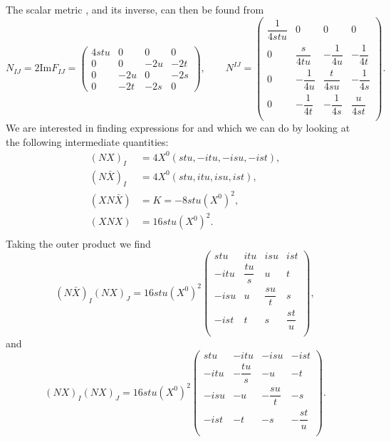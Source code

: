 The scalar metric , and its inverse, can then be found from
\begin{equation}
        N_{IJ} = 2\text{Im}F_{IJ} =  \begin{pmatrix} 4stu & 0 & 0 & 0  \\[4pt]
    0 & 0 &-2u & -2t \\[4pt]
   0 & -2u & 0 & -2s \\[4pt]
   0 & -2t & -2s & 0
    \end{pmatrix}, 
    \qquad 
    N^{IJ} =    \left(
\begin{array}{cccc}
 \dfrac{1}{4 s t u} & 0 & 0 & 0 \\[9pt]
 0 & \dfrac{s}{4 t u} & -\dfrac{1}{4 u} & -\dfrac{1}{4 t} \\[9pt]
 0 & -\dfrac{1}{4 u} & \dfrac{t}{4 s u} & -\dfrac{1}{4 s} \\[9pt]
 0 & -\dfrac{1}{4 t} & -\dfrac{1}{4 s} & \dfrac{u}{4 s t} \\[9pt]
\end{array}
\right).
\end{equation}
We are interested in finding expressions for  and  which we can do by looking at the following intermediate quantities:
\begin{equation*}
\begin{aligned}
    (NX)_I &= 4X^0 \left(  s t u ,- i t u ,- i s u,- i s t  \right), \\
    (N\bar{X})_I &= 4X^0\left(  s t u , i t u , i s u , i s t  \right),\\
    (XN\bar{X}) &= K = -8stu (X^0)^2,\\
    (XNX) &= 16 s t u (X^0)^2 .  \\
\end{aligned}
\end{equation*}
Taking the outer product we find
\begin{equation*}
    (N\bar{X})_I(NX)_J = 16stu (X^0)^2 \left(
\begin{array}{cccc}
 s t u & i t u & i s u & i s t \\[5pt]
 -i t u & \dfrac{t u}{s} & u & t \\[5pt]
 -i s u & u & \dfrac{s u}{t} & s \\[5pt]
 -i s t & t & s & \dfrac{s t}{u} \\
\end{array}
\right),
\end{equation*}
and
\begin{equation*}
    (NX)_I(NX)_J = 16stu (X^0)^2
\left(
\begin{array}{cccc}
 s t u & -i t u & -i s u & -i s t \\[5pt]
 -i t u & -\dfrac{t u}{s} & -u & -t \\[5pt]
 -i s u & -u & -\dfrac{s u}{t} & -s \\[5pt]
 -i s t & -t & -s & -\dfrac{s t}{u} \\
\end{array}
\right).
\end{equation*}

